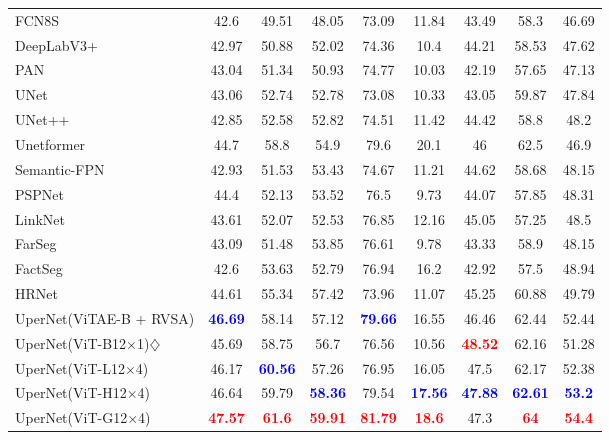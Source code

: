 \begin{table*}[t]{\textwidth=0mm}
{\begin{tabular}{l|c c c c c c c | c}
        FCN8S \cite{long2015fully} & 42.6 & 49.51 & 48.05 & 73.09 & 11.84 & 43.49 & 58.3 & 46.69 \\
        DeepLabV3+ \cite{chen2018encoder} & 42.97 & 50.88 & 52.02 & 74.36 & 10.4 & 44.21 & 58.53 & 47.62 \\
        PAN \cite{li2018pyramid} & 43.04 & 51.34 & 50.93 & 74.77 & 10.03 & 42.19 & 57.65 & 47.13 \\
        UNet \cite{ronneberger2015u} & 43.06 & 52.74 & 52.78 & 73.08 & 10.33 & 43.05 & 59.87 & 47.84 \\
        UNet++ \cite{zhou2018unet++} & 42.85 & 52.58 & 52.82 & 74.51 & 11.42 & 44.42 & 58.8 & 48.2 \\
        Unetformer \cite{wang2022unetformer} & 44.7 & 58.8 & 54.9 & 79.6 & 20.1 & 46 & 62.5 & 46.9 \\
        Semantic-FPN \cite{kirillov2019panoptic} & 42.93 & 51.53 & 53.43 & 74.67 & 11.21 & 44.62 & 58.68 & 48.15 \\
        PSPNet \cite{zhao2017pyramid} & 44.4 & 52.13 & 53.52 & 76.5 & 9.73 & 44.07 & 57.85 & 48.31 \\
        LinkNet \cite{chaurasia2017linknet} & 43.61 & 52.07 & 52.53 & 76.85 & 12.16 & 45.05 & 57.25 & 48.5 \\
        FarSeg \cite{zheng2020foreground} & 43.09 & 51.48 & 53.85 & 76.61 & 9.78 & 43.33 & 58.9 & 48.15 \\
        FactSeg \cite{ma2021factseg} & 42.6 & 53.63 & 52.79 & 76.94 & 16.2 & 42.92 & 57.5 & 48.94 \\
        HRNet \cite{wang2020deep} & 44.61 & 55.34 & 57.42 & 73.96 & 11.07 & 45.25 & 60.88 & 49.79 \\
        UperNet(ViTAE-B + RVSA) \cite{wang2022advancing} & \textbf{\textcolor{blue}{46.69}} & 58.14 & 57.12 & \textbf{\textcolor{blue}{79.66}} & 16.55 & 46.46 & 62.44 & 52.44 \\ \hline
        UperNet(ViT-B12$\times$1)$\diamondsuit$\cite{wang2022advancing} & 45.69 & 58.75 & 56.7 & 76.56 & 10.56 & \textbf{\textcolor{red}{48.52}} & 62.16 & 51.28 \\
        UperNet(ViT-L12$\times$4) & 46.17 & \textbf{\textcolor{blue}{60.56}} & 57.26 & 76.95 & 16.05 & 47.5 & 62.17 & 52.38 \\
        UperNet(ViT-H12$\times$4) & 46.64 & 59.79 & \textbf{\textcolor{blue}{58.36}} & 79.54 & \textbf{\textcolor{blue}{17.56}} & \textbf{\textcolor{blue}{47.88}} & \textbf{\textcolor{blue}{62.61}} & \textbf{\textcolor{blue}{53.2}} \\
        UperNet(ViT-G12$\times$4) & \textbf{\textcolor{red}{47.57}} & \textbf{\textcolor{red}{61.6}} & \textbf{\textcolor{red}{59.91}} & \textbf{\textcolor{red}{81.79}} & \textbf{\textcolor{red}{18.6}} & 47.3 & \textbf{\textcolor{red}{64}} & \textbf{\textcolor{red}{54.4}} \\ \hline
       

    \end{tabular}
    }
    \label{tab:loveda table}
\end{table*} 
